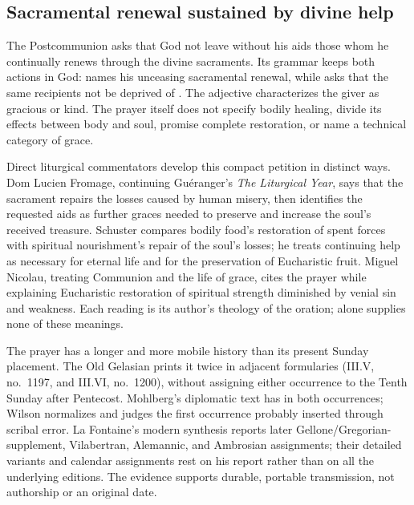 \subsection*{Sacramental renewal sustained by divine help\enspace{}}

The Postcommunion asks that God not leave without his aids those whom he
continually renews through the divine sacraments. Its grammar keeps both
actions in God:  names his unceasing sacramental
renewal, while  asks that the same recipients not be
deprived of . The adjective  characterizes
the giver as gracious or kind. The prayer itself does not specify bodily
healing, divide its effects between body and soul, promise complete restoration,
or name a technical category of grace.

Direct liturgical commentators develop this compact petition in distinct
ways. Dom Lucien Fromage, continuing Guéranger's \emph{The Liturgical Year},
says that the sacrament repairs the losses caused by human
misery, then identifies the requested aids as further graces needed to
preserve and increase the soul's received treasure. Schuster compares bodily
food's restoration of spent forces with spiritual nourishment's repair of the
soul's losses; he treats continuing help as necessary for eternal life and for
the preservation of Eucharistic fruit. Miguel Nicolau, treating Communion and
the life of grace, cites the prayer while explaining Eucharistic restoration
of spiritual strength diminished by venial sin and weakness. Each reading is
its author's theology of the oration;  alone supplies none of
these meanings.

The prayer has a longer and more mobile history than its present Sunday
placement. The Old Gelasian prints it twice in adjacent formularies
(III.V, no.~1197, and III.VI, no.~1200), without assigning either occurrence
to the Tenth Sunday after Pentecost. Mohlberg's diplomatic text has
 in both occurrences; Wilson normalizes  and
judges the first occurrence probably inserted through scribal error. La
Fontaine's modern synthesis reports later Gellone/Gregorian-supplement,
Vilabertran, Alemannic, and Ambrosian assignments; their detailed variants and
calendar assignments rest on his report rather than on all the underlying
editions.
The evidence supports durable, portable transmission, not authorship or an
original date.
